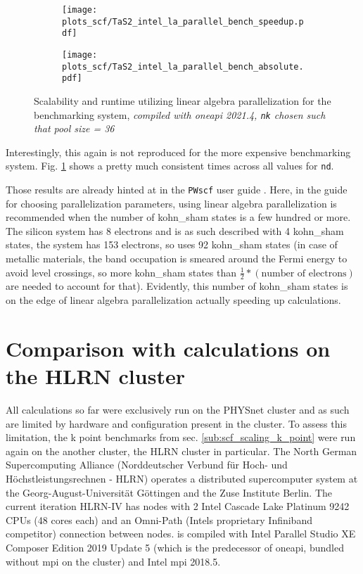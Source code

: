 \documentclass[main.tex]{subfiles}
\begin{document}
\begin{figure}[ht!]
\begin{subfigure}[b]{0.49\textwidth}
    \centering
    \texttt{[image: plots\_scf/TaS2\_intel\_la\_parallel\_bench\_speedup.pdf]}
\end{subfigure}
\begin{subfigure}[b]{0.49\textwidth}
    \centering
    \texttt{[image: plots\_scf/TaS2\_intel\_la\_parallel\_bench\_absolute.pdf]}
\end{subfigure}
\label{fig:scaling_scf_nd_tas2}
\caption{Scalability and runtime utilizing linear algebra parallelization for the \TaS benchmarking system, \emph{\QE compiled with \gls{oneapi} 2021.4, \texttt{nk} chosen such that pool size = 36}}
\end{figure}

Interestingly, this again is not reproduced for the more expensive \TaS benchmarking system.
Fig. \ref{fig:scaling_scf_nd_tas2} shows a pretty much consistent times across all values for \texttt{nd}.

Those results are already hinted at in the \texttt{PWscf} user guide \cite{noauthor_pwscf_nodate}.
Here, in the guide for choosing parallelization parameters, using linear algebra parallelization is recommended when the number of \acrshort{kohn_sham} states is a few hundred or more.
The silicon system has 8 electrons and is as such described with 4 \gls{kohn_sham} states, the \TaS system has 153 electrons, so \QE uses 92 \gls{kohn_sham} states (in case of metallic materials, the band occupation is smeared around the Fermi energy to avoid level crossings, so more \gls{kohn_sham} states than \(\frac{1}{2} * (\textrm{number of electrons})\) are needed to account for that).
Evidently, this number of \acrshort{kohn_sham} states is on the edge of linear algebra parallelization actually speeding up calculations.

\section{Comparison with calculations on the HLRN cluster}

All calculations so far were exclusively run on the PHYSnet cluster and as such are limited by hardware and configuration present in the cluster.
To assess this limitation, the k point benchmarks from sec. \ref{sub:scf_scaling_k_point} were run again on the another cluster, the HLRN cluster in particular.
The North German Supercomputing Alliance (Norddeutscher Verbund für Hoch- und Höchstleistungsrechnen - HLRN) operates a distributed supercomputer system at the Georg-August-Universität Göttingen and the Zuse Institute Berlin.
The current iteration HLRN-IV has nodes with 2 Intel Cascade Lake Platinum 9242 CPUs (48 cores each) and an Omni-Path (Intels proprietary Infiniband competitor) connection between nodes.
\QE is compiled with Intel Parallel Studio XE Composer Edition 2019 Update 5 (which is the predecessor of \gls{oneapi}, bundled without \gls{mpi} on the cluster) and Intel \gls{mpi} 2018.5.
\end{document}
